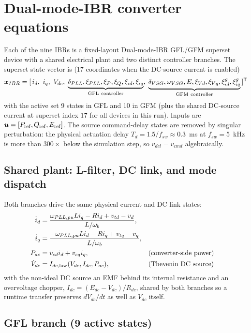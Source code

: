 \documentclass[12pt,a4paper]{article}
\newcommand{\vect}[1]{\boldsymbol{#1}}
\begin{document}
\section{Dual-mode-IBR converter equations}
\label{sec:ibr}

Each of the nine IBRs is a fixed-layout Dual-mode-IBR GFL/GFM superset device with a
shared electrical plant and two distinct controller branches.  The superset
state vector is (17 coordinates when the DC-source current is enabled)
\[
\vect x_{IBR}=[\,i_d,\ i_q,\ V_{dc},\;
\underbrace{\delta_{PLL},\xi_{PLL},\xi_P,\xi_Q,\xi_{id},\xi_{iq}}_{\rm GFL\ controller},\;
\underbrace{\delta_{VSG},\omega_{VSG},E,\xi_{Vd},\xi_{Vq},\xi_{id}^{g},\xi_{iq}^{g}}_{\rm GFM\ controller}\,]^{\mathsf T}
\]
with the active set 9 states in GFL and 10 in GFM (plus the shared DC-source
current at superset index 17 for all devices in this run).  Inputs are
$\vect u=[P_{\rm ref},Q_{\rm ref},E_{\rm ref}]$.  The source command-delay
states are removed by singular perturbation: the physical actuation delay
$T_d=1.5/f_{sw}\approx0.3$~ms at $f_{sw}=5$~kHz is more than $300\times$ below
the simulation step, so $v_{del}=v_{cmd}$ algebraically.

\subsection{Shared plant: L-filter, DC link, and mode dispatch}

Both branches drive the same physical current and DC-link states:
\begin{align}
\dot i_d&=\frac{\omega_{PLL,pu}L i_q-R i_d+v_{td}-v_d}{L/\omega_b},\\
\dot i_q&=\frac{-\omega_{PLL,pu}L i_d-R i_q+v_{tq}-v_q}{L/\omega_b},\\
P_{ac}&=v_{cd}i_d+v_{cq}i_q,&& \text{(converter-side power)}\\
\dot V_{dc}&=I_{dc,\rm law}(V_{dc},I_{dc},P_{ac}),&& \text{(Thevenin DC source)}
\end{align}
with the non-ideal DC source an EMF behind its internal resistance and an
overvoltage chopper, $I_{dc}=(E_{dc}-V_{dc})/R_{dc}$, shared by both branches
so a runtime transfer preserves $dV_{dc}/dt$ as well as $V_{dc}$ itself.

\subsection{GFL branch (9 active states)}
\end{document}
